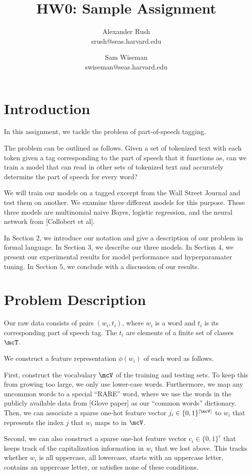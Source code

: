\documentclass[11pt]{article}
\title{HW0: Sample Assignment}
\author{Alexander Rush \\ srush@seas.harvard.edu \and Sam Wiseman \\ swiseman@seas.harvard.edu }
\begin{document}
\maketitle{}
\section{Introduction}

In this assignment, we tackle the problem of part-of-speech tagging. 

The problem can be outlined as follows. Given a set of tokenized text with each token given a tag corresponding to the part of speech that it functions as, can we train a model that can read in other sets of tokenized text and accurately determine the part of speech for every word? 

We will train our models on a tagged excerpt from the Wall Street Journal and test them on another. We examine three different models for this purpose. These three models are multinomial naive Bayes, logistic regression, and the neural network from [Collobert et al]. 

In Section $2$, we introduce our notation and give a description of our problem in formal language. In Section $3$, we describe our three models. In Section $4$, we present our experimental results for model performance and hyperparamater tuning. In Section $5$, we conclude with a discussion of our results. 

\section{Problem Description}

Our raw data consists of pairs $(w_i, t_i)$, where $w_i$ is a word and $t_i$ is its corresponding part of speech tag. The $t_i$ are elements of a finite set of classes $\mcT$. 

We construct a feature representation $\phi(w_i)$ of each word as follows. 

First, construct the vocabulary $\mcV$ of the training and testing sets. To keep this from growing too large, we only use lower-case words. Furthermore, we map any uncommon words to a special ``RARE'' word, where we use the words in the publicly available data from [Glove paper] as our ``common words'' dictionary. Then, we can associate a sparse one-hot feature vector $j_i \in \{0,1\}^{|\mcV|}$ to $w_i$ that represents the index $j$ that $w_i$ maps to in $\mcV$. 

Second, we can also construct a sparse one-hot feature vector $c_i \in \{0,1\}^c$ that keeps track of the capitalization information in $w_i$ that we lost above. This tracks whether $w_i$ is all uppercase, all lowercase, starts with an uppercase letter, contains an uppercase letter, or satisfies none of these conditions. 
\end{document}

